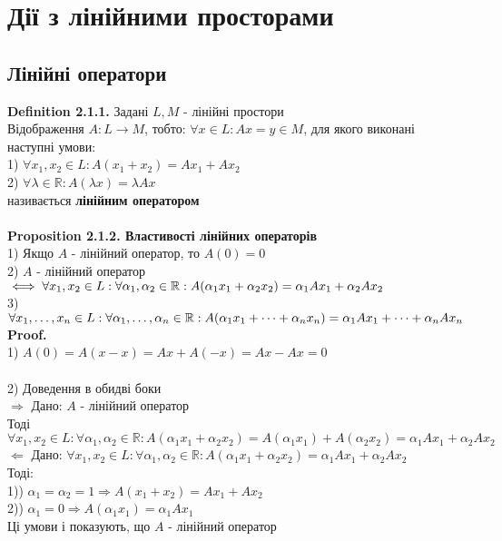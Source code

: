\documentclass[a4paper, 14pt]{extarticle}
\def\defin#1{\textbf{Definition {#1}}}
\def\prp#1{\textbf{Proposition {#1}}}
\def\proof{\textbf{Proof.}\\}
\def\bigline{\vspace{5mm}\\}
\begin{document}
	
	\section{Дії з лінійними просторами}
	\subsection{Лінійні оператори}
	\defin{2.1.1.} Задані $L,M$ - лінійні простори\\
	Відображення $A: L \to M$, тобто: $\forall x \in L: Ax=y \in M$, для якого виконані наступні умови:\\
	1) $\forall x_1,x_2 \in L: A(x_1+x_2)=Ax_1+Ax_2$\\
	2) $\forall \lambda \in \mathbb{R}: A(\lambda x) = \lambda Ax$\\
	називається \textbf{лінійним оператором}\\
	\\
	\prp{2.1.2. Властивості лінійних операторів}\\
	1) Якщо $A$ - лінійний оператор, то $A(0) = 0$\\
	2) $A$ - лінійний оператор $\iff \forall x_1,x_2 \in L: \forall \alpha_1, \alpha_2 \in \mathbb{R}: \\ A(\alpha_1 x_1 + \alpha_2 x_2) = \alpha_1 Ax_1 + \alpha_2 Ax_2$\\
	3) $\forall x_1,\dots, x_n \in L: \forall \alpha_1, \dots, \alpha_n \in \mathbb{R}: \\ A(\alpha_1 x_1 + \dots + \alpha_n x_n) = \alpha_1 Ax_1 + \dots + \alpha_n Ax_n$\\
	\proof
	1) $A(0) = A(x - x) = Ax + A(-x) = Ax - Ax = 0$\\
	\\
	2) Доведення в обидві боки\\
	$\boxed{\Rightarrow}$ Дано: $A$ - лінійний оператор\\
	Тоді $\forall x_1,x_2 \in L: \forall \alpha_1, \alpha_2 \in \mathbb{R}: A(\alpha_1 x_1 + \alpha_2 x_2) = A(\alpha_1 x_1) + A(\alpha_2 x_2) = \alpha_1 Ax_1 + \alpha_2 Ax_2$
	\bigline
	$\boxed{\Leftarrow}$ Дано: $\forall x_1,x_2 \in L: \forall \alpha_1, \alpha_2 \in \mathbb{R}: A(\alpha_1 x_1 + \alpha_2 x_2) = \alpha_1 Ax_1 + \alpha_2 Ax_2$\\
	Тоді:\\
	1)) $\alpha_1 = \alpha_2 = 1 \Rightarrow A(x_1 + x_2) = Ax_1 + Ax_2$\\
	2)) $\alpha_1 = 0 \Rightarrow A(\alpha_1 x_1) = \alpha_1 Ax_1$\\
	Ці умови і показують, що $A$ - лінійний оператор\\
\end{document}
